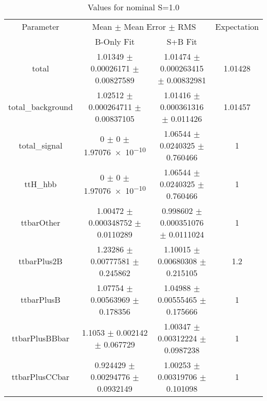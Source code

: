 \begin{table}
\centering
\caption{Values for nominal S=1.0}
\begin{tabular}{cccc}
\toprule
Parameter & \multicolumn{2}{c}{Mean $\pm$ Mean Error $\pm$ RMS} & Expectation\\
 & B-Only Fit & S+B Fit & \\
\midrule
total & \num{1.01349} $\pm$ \num{0.00026171} $\pm$ \num{0.00827589} & \num{1.01474} $\pm$ \num{0.000263415} $\pm$ \num{0.00832981} & \num{1.01428}\\
total\_background & \num{1.02512} $\pm$ \num{0.000264711} $\pm$ \num{0.00837105} & \num{1.01416} $\pm$ \num{0.000361316} $\pm$ \num{0.011426} & \num{1.01457}\\
total\_signal & \num{0} $\pm$ \num{0} $\pm$ \num{1.97076e-10} & \num{1.06544} $\pm$ \num{0.0240325} $\pm$ \num{0.760466} & \num{1}\\
ttH\_hbb & \num{0} $\pm$ \num{0} $\pm$ \num{1.97076e-10} & \num{1.06544} $\pm$ \num{0.0240325} $\pm$ \num{0.760466} & \num{1}\\
ttbarOther & \num{1.00472} $\pm$ \num{0.000348752} $\pm$ \num{0.0110289} & \num{0.998602} $\pm$ \num{0.000351076} $\pm$ \num{0.0111024} & \num{1}\\
ttbarPlus2B & \num{1.23286} $\pm$ \num{0.00777581} $\pm$ \num{0.245862} & \num{1.10015} $\pm$ \num{0.00680308} $\pm$ \num{0.215105} & \num{1.2}\\
ttbarPlusB & \num{1.07754} $\pm$ \num{0.00563969} $\pm$ \num{0.178356} & \num{1.04988} $\pm$ \num{0.00555465} $\pm$ \num{0.175666} & \num{1}\\
ttbarPlusBBbar & \num{1.1053} $\pm$ \num{0.002142} $\pm$ \num{0.067729} & \num{1.00347} $\pm$ \num{0.00312224} $\pm$ \num{0.0987238} & \num{1}\\
ttbarPlusCCbar & \num{0.924429} $\pm$ \num{0.00294776} $\pm$ \num{0.0932149} & \num{1.00253} $\pm$ \num{0.00319706} $\pm$ \num{0.101098} & \num{1}\\
\bottomrule
\end{tabular}
\end{table}